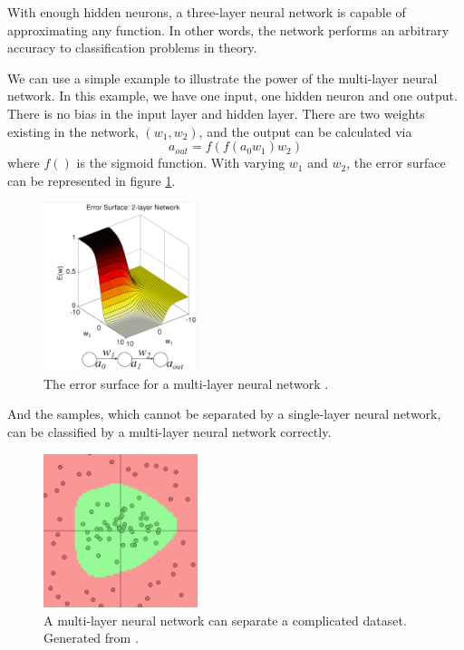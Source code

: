 With enough hidden neurons, a three-layer neural network is capable of approximating any function. In other words, the network performs an arbitrary accuracy to classification problems in theory. 

We can use a simple example to illustrate the power of the multi-layer neural network. In this example, we have one input, one hidden neuron and one output. There is no bias in the input layer and hidden layer. There are two weights existing in the network, $(w_{1}, w_{2})$, and the output can be calculated via
\begin{equation}\label{eq:2LayerExample}
a_{out} = f(f(a_{0}w_{1})w_{2})
\end{equation}
where $f()$ is the sigmoid function. With varying $w_{1}$ and $w_{2}$, the error surface can be represented in figure \ref{fig:2LayerErrorSurface}.
\graphicspath{ {./Figures/} }
\begin{figure}[!htb]
\centering
\includegraphics[width=0.4\textwidth]{2LayerErrorSurface.png}
\caption{\label{fig:2LayerErrorSurface}The error surface for a multi-layer neural network \citep{ErrorFigure1}.}
\end{figure}
And the samples, which cannot be separated by a single-layer neural network, can be classified by a multi-layer neural network correctly.
\graphicspath{ {./Figures/} }
\begin{figure}[!htb]
\centering
\includegraphics[width=0.4\textwidth]{MultiLayerCircleData.png}
\caption{\label{fig:MultiLayerErrorSurface}A multi-layer neural network can separate a complicated dataset. Generated from \citep{GenerateNN}.}
\end{figure}

